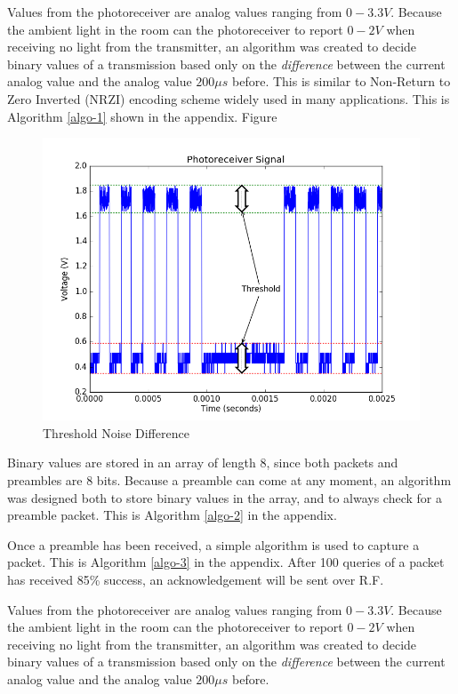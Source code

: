 \documentclass[letterpaper,10pt]{article}
\begin{document}
\begin{spacing}{1.15}
Values from the photoreceiver are analog values ranging from $0-3.3V$. Because the ambient light in the room can the photoreceiver to report $0-2V$ when receiving no light from the transmitter, an algorithm was created to decide binary values of a transmission based only on the \textit{difference} between the current analog value and the analog value $200 \mu s$ before. This is similar to Non-Return to Zero Inverted (NRZI) encoding scheme widely used in many applications. This is Algorithm \ref{algo-1} shown in the appendix. Figure 

\begin{figure} [H]
	\centering
	\includegraphics[scale=0.45]{threshold.png}
	\caption{Threshold Noise Difference\label{fig:threshold}}
\end{figure}


Binary values are stored in an array of length 8, since both packets and preambles are 8 bits. Because a preamble can come at any moment, an algorithm was designed both to store binary values in the array, and to always check for a preamble packet. This is Algorithm \ref{algo-2} in the appendix.

Once a preamble has been received, a simple algorithm is used to capture a packet. This is Algorithm \ref{algo-3} in the appendix. After 100 queries of a packet has received 85\% success, an acknowledgement will be sent over R.F.


Values from the photoreceiver are analog values ranging from $0-3.3V$. Because the ambient light in the room can the photoreceiver to report $0-2V$ when receiving no light from the transmitter, an algorithm was created to decide binary values of a transmission based only on the \textit{difference} between the current analog value and the analog value $200 \mu s$ before.



\end{spacing}
\end{document}
